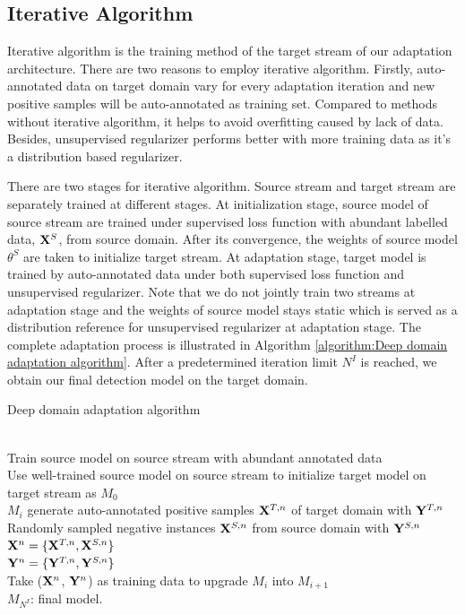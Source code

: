 \documentclass[runningheads]{llncs}
\begin{document}
\subsection{Iterative Algorithm}
\label{Section:Iterative Algorithm}

Iterative algorithm is the training method of the target stream of our adaptation architecture. There are two reasons to employ iterative algorithm. Firstly, auto-annotated data on target domain vary for every adaptation iteration and new positive samples will be auto-annotated as training set. Compared to methods without iterative algorithm, it helps to avoid overfitting caused by lack of data. Besides, unsupervised regularizer performs better with more training data as it's a distribution based regularizer.

There are two stages for iterative algorithm. Source stream and target stream are separately trained at different stages. At initialization stage, source model of source stream are trained under supervised loss function with abundant labelled data, ${\bf X}^{S}$, from source domain. After its convergence, the weights of source model $\theta^{S}$ are taken to initialize target stream. At adaptation stage, target model is trained by auto-annotated data under both supervised loss function and unsupervised regularizer. Note that we do not jointly train two streams at adaptation stage and the weights of source model stays static which is served as a distribution reference for unsupervised regularizer at adaptation stage. The complete adaptation process is illustrated in Algorithm \ref{algorithm:Deep domain adaptation algorithm}. After a predetermined iteration limit $N^{I}$ is reached, we obtain our final detection model on the target domain.

\begin{algorithm}
\caption{Deep domain adaptation algorithm}
\label{algorithm:Deep domain adaptation algorithm}
\begin{algorithmic}[1]
 {} \\
\indent Train source model on source stream with abundant annotated data \\
\indent Use well-trained source model on source stream to initialize target model on target stream as $M_{0}$
 \\
\indent \indent $M_{i}$ generate auto-annotated positive samples ${\bf X}^{T,n}$ of target domain with ${\bf Y}^{T,n}$\\
\indent \indent Randomly sampled negative instances ${\bf X}^{S,n}$ from source domain with ${\bf Y}^{S,n}$\\
\indent \indent ${\bf X}^{n} = \{{\bf X}^{T,n}, {\bf X}^{S,n}\}$ \\
\indent \indent ${\bf Y}^{n} = \{{\bf Y}^{T,n}, {\bf Y}^{S,n}\}$ \\
\indent \indent Take (${\bf X}^{n}$, ${\bf Y}^{n}$) as training data to upgrade $M_{i}$ into $M_{i+1}$
\EndFor \\
\indent $M_{N^{I}}$: final model.
\EndProcedure
\end{algorithmic}
\end{algorithm}
\end{document}
